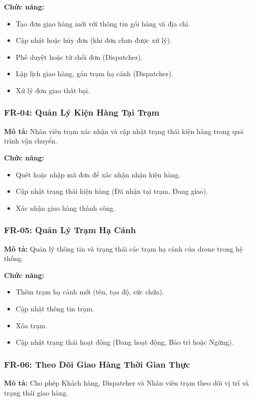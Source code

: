 \textbf{Chức năng:}
\begin{itemize}
  \item Tạo đơn giao hàng mới với thông tin gói hàng và địa chỉ.
  \item Cập nhật hoặc hủy đơn (khi đơn chưa được xử lý).
  \item Phê duyệt hoặc từ chối đơn (Dispatcher).
  \item Lập lịch giao hàng, gán trạm hạ cánh (Dispatcher).
  \item Xử lý đơn giao thất bại.
\end{itemize}

\subsubsection{FR-04: Quản Lý Kiện Hàng Tại Trạm}
\textbf{Mô tả:} Nhân viên trạm xác nhận và cập nhật trạng thái kiện hàng trong quá trình vận chuyển.

\textbf{Chức năng:}
\begin{itemize}
  \item Quét hoặc nhập mã đơn để xác nhận nhận kiện hàng.
  \item Cập nhật trạng thái kiện hàng (Đã nhận tại trạm, Đang giao).
  \item Xác nhận giao hàng thành công.
\end{itemize}

\subsubsection{FR-05: Quản Lý Trạm Hạ Cánh}
\textbf{Mô tả:} Quản lý thông tin và trạng thái các trạm hạ cánh của drone trong hệ thống.

\textbf{Chức năng:}
\begin{itemize}
  \item Thêm trạm hạ cánh mới (tên, tọa độ, sức chứa).
  \item Cập nhật thông tin trạm.
  \item Xóa trạm.
  \item Cập nhật trạng thái hoạt động (Đang hoạt động, Bảo trì hoặc Ngừng).
\end{itemize}

\subsubsection{FR-06: Theo Dõi Giao Hàng Thời Gian Thực}
\textbf{Mô tả:} Cho phép Khách hàng, Dispatcher và Nhân viên trạm theo dõi vị trí và trạng thái giao hàng.


